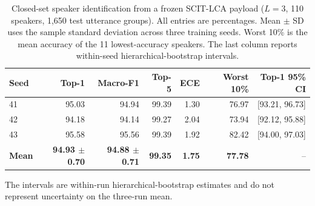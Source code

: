 \begin{table}[t]
\centering
\caption{Closed-set speaker identification from a frozen SCIT-LCA payload ($L=3$, 110 speakers, 1,650 test utterance groups). All entries are percentages. Mean $\pm$ SD uses the sample standard deviation across three training seeds. Worst 10\% is the mean accuracy of the 11 lowest-accuracy speakers. The last column reports within-seed hierarchical-bootstrap intervals.}
\label{tab:rv3-speaker}
\small\setlength{\tabcolsep}{5pt}
\begin{tabular}{lrrrrrr}
\toprule
Seed & Top-1 & Macro-F1 & Top-5 & ECE & Worst 10\% & Top-1 95\% CI\\
\midrule
41 & 95.03 & 94.94 & 99.39 & 1.30 & 76.97 & [93.21, 96.73]\\
42 & 94.18 & 94.14 & 99.27 & 2.04 & 73.94 & [92.12, 95.88]\\
43 & 95.58 & 95.56 & 99.39 & 1.92 & 82.42 & [94.00, 97.03]\\
\textbf{Mean} & \textbf{94.93 $\pm$ 0.70} & \textbf{94.88 $\pm$ 0.71} & \textbf{99.35} & \textbf{1.75} & \textbf{77.78} & --\\
\bottomrule
\end{tabular}
\par\smallskip
\parbox{\textwidth}{\footnotesize The intervals are within-run hierarchical-bootstrap estimates and do not represent uncertainty on the three-run mean.}
\end{table}
